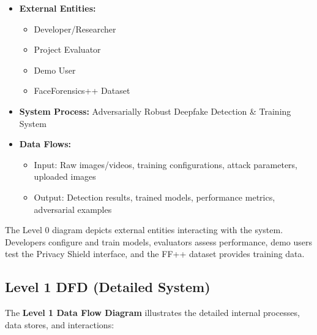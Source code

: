 \documentclass[a4paper,12pt]{article}
\begin{document}
\begin{itemize}
    \item \textbf{External Entities:} 
    \begin{itemize}
        \item Developer/Researcher
        \item Project Evaluator
        \item Demo User
        \item FaceForensics++ Dataset
    \end{itemize}
    
    \item \textbf{System Process:} Adversarially Robust Deepfake Detection \& Training System
    
    \item \textbf{Data Flows:} 
    \begin{itemize}
        \item Input: Raw images/videos, training configurations, attack parameters, uploaded images
        \item Output: Detection results, trained models, performance metrics, adversarial examples
    \end{itemize}
\end{itemize}

The Level 0 diagram depicts external entities interacting with the system. Developers configure and train models, evaluators assess performance, demo users test the Privacy Shield interface, and the FF++ dataset provides training data.

\subsection{Level 1 DFD (Detailed System)}
The \textbf{Level 1 Data Flow Diagram} illustrates the detailed internal processes, data stores, and interactions:
\end{document}
